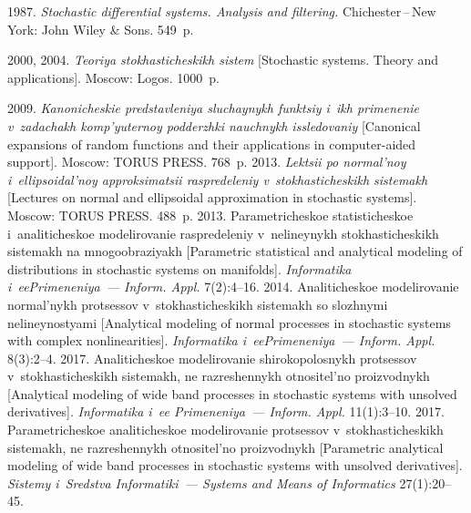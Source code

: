   \begin{multicols}{2}

\renewcommand{\bibname}{\protect\rmfamily References}

{\small\frenchspacing
 {%
 \begin{thebibliography}{99}
1987. \textit{Stochastic differential systems. Analysis and filtering.} 
Chichester\,--\,New York: John Wiley \& Sons. 549~p.

 2000, 2004.
\textit{Teoriya stokhasticheskikh sistem} [Stochastic systems. Theory and  applications]. 
Moscow: Logos. 1000~p.  %

 2009. \textit{Kanonicheskie predstavleniya sluchaynykh funktsiy i~ikh primenenie 
v~zadachakh komp'yuternoy podderzhki nauchnykh issledovaniy} 
[Canonical expansions of random functions and their applications in computer-aided support]. 
Moscow: TORUS PRESS. 768~p.
 2013. \textit{Lektsii po nor\-mal'\-noy i~ellipsoidal'noy approksimatsii raspredeleniy 
 v~sto\-kha\-sti\-che\-skikh sistemakh} [Lectures on normal and ellipsoidal approximation in stochastic systems].
  Moscow: TORUS PRESS. 488~p.
 2013. Parametricheskoe statisticheskoe 
i~analiticheskoe modelirovanie raspredeleniy v~nelineynykh stokhasticheskikh sistemakh na 
mno\-go\-ob\-ra\-zi\-yakh 
[Parametric statistical and analytical modeling of distributions in stochastic systems on manifolds]. 
\textit{Informatika i~eePrimeneniya~--- Inform. Appl.} 7(2):4--16.
 2014. Analiticheskoe modelirovanie normal'nykh protsessov 
 v~sto\-kha\-sti\-che\-skikh sistemakh so slozhnymi nelineynostyami 
 [Analytical modeling of normal processes in stochastic systems with complex nonlinearities]. 
 \textit{Informatika i~eePrimeneniya~--- Inform. Appl.} 8(3):2--4.
 2017. Analiticheskoe modelirovanie shirokopolosnykh protsessov v~stokhasticheskikh sistemakh, 
 ne razreshennykh otnositel'no proizvodnykh [Analytical modeling of wide band processes in
  stochastic systems with unsolved derivatives]. 
  \textit{Informatika i~ee Primeneniya~--- Inform. Appl.} 11(1):3--10.
 2017. Parametricheskoe analiticheskoe modelirovanie protsessov 
v~stokhasticheskikh  sistemakh, ne razreshennykh otnositel'no proizvodnykh 
[Parametric analytical modeling of wide band processes in stochastic systems 
with unsolved derivatives]. \textit{Sistemy i~Sredstva Informatiki~--- 
Systems and Means of Informatics} 27(1):20--45.


\end{thebibliography}}}
\end{multicols}
